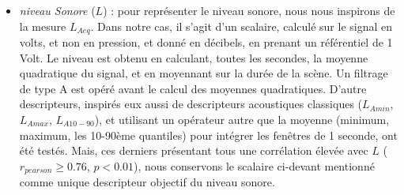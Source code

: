 \begin{itemize}
\begin{itemize}
\item \emph{niveau Sonore} ($L$) : pour représenter le niveau sonore, nous nous inspirons de la mesure $L_{Aeq}$. Dans notre cas, il s'agit d'un scalaire, calculé sur le signal en volts, et non en pression, et donné en décibels, en prenant un référentiel de 1 Volt. Le niveau est obtenu en calculant, toutes les secondes, la moyenne quadratique du signal, et en moyennant sur la durée de la scène. Un filtrage de type A est opéré avant le calcul des moyennes quadratiques. D'autre descripteurs, inspirés eux aussi de descripteurs acoustiques classiques ($L_{Amin}$, $L_{Amax}$, $L_{A10-90}$), et utilisant un opérateur autre que la moyenne (minimum, maximum, les 10-90ème quantiles) pour intégrer les fenêtres de 1 seconde, ont été testés. Mais, ces derniers présentant tous une corrélation élevée avec $L$ ($r_{pearson}\geq0.76$, $p<0.01$), nous conservons le scalaire ci-devant mentionné comme unique descripteur objectif du niveau sonore.
\end{itemize}
\end{itemize}

